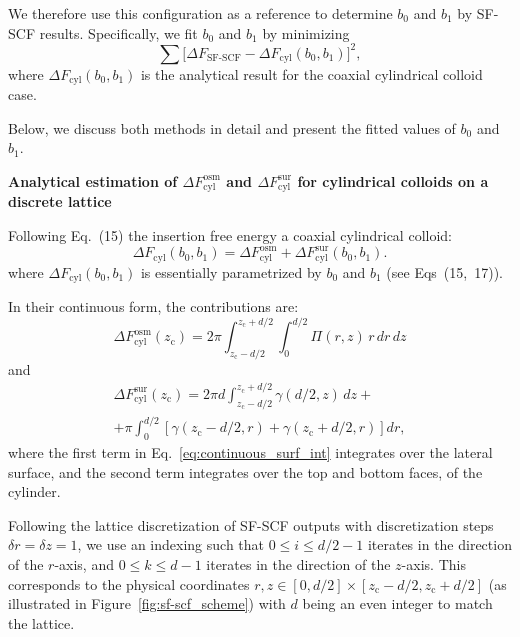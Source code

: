 \documentclass[10pt, a4paper, twocolumn]{article}
\begin{document}
We therefore use this configuration as a reference to determine $b_0$ and $b_1$ by SF-SCF results.
Specifically, we fit $b_0$ and $b_1$ by minimizing 
\begin{equation}
    \sum \bigl[\Delta F_{\text{SF-SCF}} - \Delta F_{\text{cyl}}(b_0,b_1)\bigr]^2,
    \label{eq:b0_b1_fit}
\end{equation}
where $\Delta F_{\text{cyl}}(b_0,b_1)$ is the analytical result for the coaxial cylindrical colloid case.

Below, we discuss both methods in detail and present the fitted values of $b_0$ and $b_1$.


\bigskip
\textbf{Analytical estimation of $\Delta F_{\text{cyl}}^{\text{osm}}$ and $\Delta F_{\text{cyl}}^{\text{sur}}$ for cylindrical colloids on a discrete lattice}

Following Eq.~(15) the insertion free energy a coaxial cylindrical colloid:
\begin{equation}
    \Delta F_{\text{cyl}}(b_0, b_1) = \Delta F_{\text{cyl}}^{\text{osm}} + \Delta F_{\text{cyl}}^{\text{sur}}(b_0, b_1).
\end{equation}
where $\Delta F_{\text{cyl}}(b_0, b_1)$ is essentially parametrized by $b_0$ and $b_1$ (see Eqs~(15,~17)).

In their continuous form, the contributions are:
\begin{equation}
    \Delta F_{\text{cyl}}^{\text{osm}}(z_{\text{c}}) = 2 \pi \int_{z_{\text{c}} - d/2}^{z_{\text{c}} + d/2} \int_{0}^{d/2} \Pi(r,z) \, r \, dr \, dz
\end{equation}
and
\begin{equation}\label{eq:continuous_surf_int}
    \begin{aligned}
        \Delta F_{\text{cyl}}^{\text{sur}}(z_{\text{c}}) = 2 \pi d \int_{z_{\text{c}} - d/2}^{z_{\text{c}} + d/2} \gamma(d/2,z) \, dz +\\
        + \pi \int_{0}^{d/2} \left[ \gamma(z_{\text{c}} - d/2, r) + \gamma(z_{\text{c}} + d/2,r) \right] dr,
    \end{aligned}
\end{equation}
where the first term in Eq.~\eqref{eq:continuous_surf_int} integrates over the lateral surface, and the second term integrates over the top and bottom faces, of the cylinder.

Following the lattice discretization of SF-SCF outputs with discretization steps $\delta r = \delta z = 1$, we use an indexing such that $0 \le i \le d/2-1$ iterates in the direction of the $r$-axis, and $0 \le k \le d-1$ iterates in the direction of the $z$-axis.
This corresponds to the physical coordinates $r,z \in [0, d/2]\times[z_{\text{c}} - d/2, z_{\text{c}} + d/2]$ (as illustrated in Figure~\ref{fig:sf-scf_scheme}) with $d$ being an even integer to match the lattice.
\end{document}

